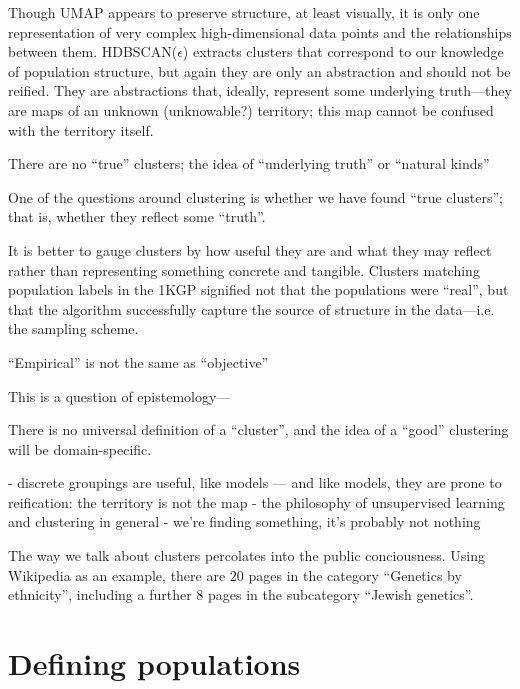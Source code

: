 Though UMAP appears to preserve structure, at least visually, it is only one representation of very complex high-dimensional data points and the relationships between them. HDBSCAN($\hat{\epsilon}$) extracts clusters that correspond to our knowledge of population structure, but again they are only an abstraction and should not be reified. They are abstractions that, ideally, represent some underlying truth---they are maps of an unknown (unknowable?) territory; this map cannot be confused with the territory itself. 

There are no ``true'' clusters; the idea of ``underlying truth'' or ``natural kinds''



One of the questions around clustering is whether we have found ``true clusters''; that is, whether they reflect some ``truth''. 

It is better to gauge clusters by how useful they are and what they may reflect rather than representing something concrete and tangible. Clusters matching population labels in the 1KGP signified not that the populations were ``real'', but that the algorithm successfully capture the source of structure in the data---i.e. the sampling scheme.

``Empirical'' is not the same as ``objective''

\citep{lewis_human_2012}

This is a question of epistemology---

There is no universal definition of a ``cluster'', and the idea of a ``good'' clustering will be domain-specific\citep{hennig_what_2015}.

- discrete groupings are useful, like models --- and like models, they are prone to reification: the territory is not the map
- the philosophy of unsupervised learning and clustering in general
- we're finding something, it's probably not nothing

The way we talk about clusters percolates into the public conciousness. Using Wikipedia as an example, there are $20$ pages in the category ``Genetics by ethnicity'', including a further $8$ pages in the subcategory ``Jewish genetics''.



\clearpage

\section{Defining populations}

